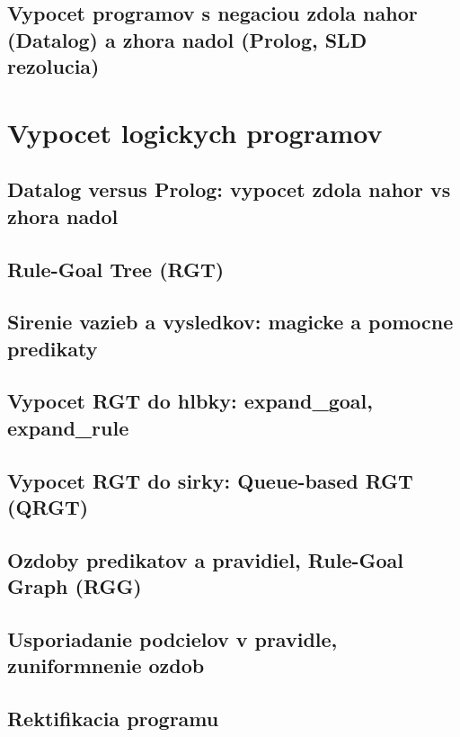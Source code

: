 \documentclass[12pt,a4paper]{article}
\begin{document}
\subsection{Vypocet programov s negaciou zdola nahor (Datalog) a zhora nadol (Prolog, SLD rezolucia)}

\section{Vypocet logickych programov}

\subsection{Datalog versus Prolog: vypocet zdola nahor vs zhora nadol}

\subsection{Rule-Goal Tree (RGT)}

\subsection{Sirenie vazieb a vysledkov: magicke a pomocne predikaty}

\subsection{Vypocet RGT do hlbky: expand\_goal, expand\_rule}

\subsection{Vypocet RGT do sirky: Queue-based RGT (QRGT)}

\subsection{Ozdoby predikatov a pravidiel, Rule-Goal Graph (RGG)}

\subsection{Usporiadanie podcielov v pravidle, zuniformnenie ozdob}

\subsection{Rektifikacia programu}
\end{document}
